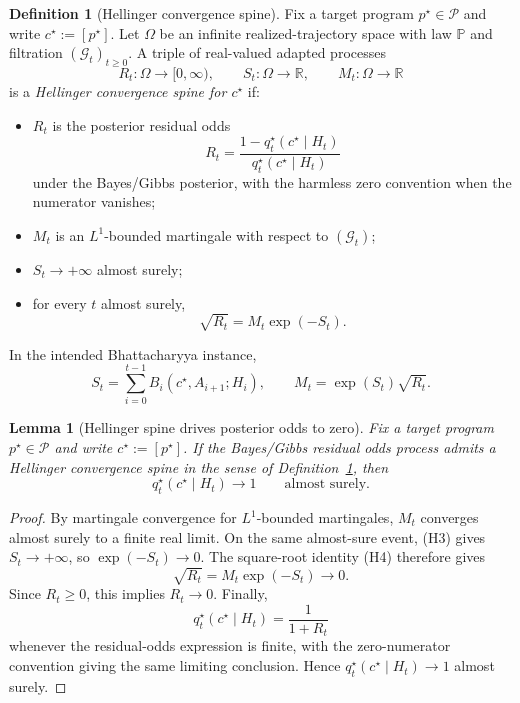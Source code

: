 \documentclass[11pt]{article}
\newtheorem{lemma}[theorem]{Lemma}
\theoremstyle{definition}
\newtheorem{definition}[theorem]{Definition}
\theoremstyle{remark}
\newcommand{\Pcal}{\mathcal{P}}
\newcommand{\Prob}{\mathbb{P}}
\begin{document}
\begin{definition}[Hellinger convergence spine]
\label{def:hellinger-spine}
Fix a target program $p^\star\in\Pcal$ and write $c^\star:=[p^\star]$. Let $\Omega$ be an infinite realized-trajectory space with law $\Prob$ and filtration $(\mathcal G_t)_{t\ge0}$. A triple of real-valued adapted processes
\[
R_t:\Omega\to[0,\infty),
\qquad
S_t:\Omega\to\mathbb R,
\qquad
M_t:\Omega\to\mathbb R
\]
is a \emph{Hellinger convergence spine for $c^\star$} if:
\begin{itemize}
\item[(H1)] $R_t$ is the posterior residual odds
\[
R_t=\frac{1-q_t^\star(c^\star\mid H_t)}{q_t^\star(c^\star\mid H_t)}
\]
under the Bayes/Gibbs posterior, with the harmless zero convention when the numerator vanishes;
\item[(H2)] $M_t$ is an $L^1$-bounded martingale with respect to $(\mathcal G_t)$;
\item[(H3)] $S_t\to+\infty$ almost surely;
\item[(H4)] for every $t$ almost surely,
\[
\sqrt{R_t}=M_t\exp(-S_t).
\]
\end{itemize}
In the intended Bhattacharyya instance,
\[
S_t=\sum_{i=0}^{t-1}B_i(c^\star,A_{i+1};H_i),
\qquad
M_t=\exp(S_t)\sqrt{R_t}.
\]
\end{definition}

\begin{lemma}[Hellinger spine drives posterior odds to zero]
\label{lem:contraction}
Fix a target program $p^\star\in\Pcal$ and write $c^\star:=[p^\star]$. If the Bayes/Gibbs residual odds process admits a Hellinger convergence spine in the sense of Definition~\ref{def:hellinger-spine}, then
\[
q_t^\star(c^\star\mid H_t)\to 1
\qquad
\text{almost surely.}
\]
\end{lemma}

\begin{proof}
By martingale convergence for $L^1$-bounded martingales, $M_t$ converges almost surely to a finite real limit. On the same almost-sure event, (H3) gives $S_t\to+\infty$, so $\exp(-S_t)\to0$. The square-root identity (H4) therefore gives
\[
\sqrt{R_t}=M_t\exp(-S_t)\longrightarrow 0.
\]
Since $R_t\ge0$, this implies $R_t\to0$. Finally,
\[
q_t^\star(c^\star\mid H_t)=\frac{1}{1+R_t}
\]
whenever the residual-odds expression is finite, with the zero-numerator convention giving the same limiting conclusion. Hence $q_t^\star(c^\star\mid H_t)\to1$ almost surely.
\end{proof}
\end{document}
